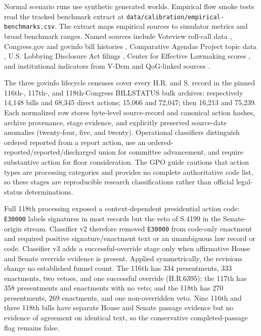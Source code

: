 \documentclass[manuscript]{acmart}
\begin{document}
Normal scenario runs use synthetic generated worlds. Empirical flow smoke tests read the tracked benchmark extract at \texttt{data/calibration/empirical-benchmarks.csv}. The extract maps empirical sources to simulator metrics and broad benchmark ranges. Named sources include Voteview roll-call data \citep{Voteview2021}, Congress.gov and govinfo bill histories \citep{CongressGovData,GovinfoBillStatus2020}, Comparative Agendas Project topic data \citep{ComparativeAgendasProject}, U.S. Lobbying Disclosure Act filings \citep{SenateLDA}, Center for Effective Lawmaking scores \citep{CenterEffectiveLawmaking,VoldenWiseman2014}, and institutional indicators from V-Dem and QoG-linked sources \citep{VDemDataset,QoGDataFinder2026}.

The three govinfo lifecycle censuses cover every H.R. and S. record in the pinned 116th-, 117th-, and 118th-Congress BILLSTATUS bulk archives: respectively 14,148 bills and 68,345 direct actions; 15,066 and 72,047; then 16,213 and 75,239. Each normalized row stores byte-level source-record and canonical action hashes, archive provenance, stage evidence, and explicitly preserved source-date anomalies (twenty-four, five, and twenty). Operational classifiers distinguish ordered reported from a report action, use an ordered-reported/reported/discharged union for committee advancement, and require substantive action for floor consideration. The GPO guide cautions that action types are processing categories and provides no complete authoritative code list, so these stages are reproducible research classifications rather than official legal-status determinations.

Full 118th processing exposed a context-dependent presidential action code: \texttt{E30000} labels signatures in most records but the veto of S.4199 in the Senate-origin stream. Classifier v2 therefore removed \texttt{E30000} from code-only enactment and required positive signature/enactment text or an unambiguous law record or code. Classifier v3 adds a successful-override stage only when affirmative House and Senate override evidence is present. Applied symmetrically, the revisions change no established funnel count. The 116th has 334 presentments, 333 enactments, two vetoes, and one successful override (H.R.6395); the 117th has 358 presentments and enactments with no veto; and the 118th has 270 presentments, 269 enactments, and one non-overridden veto. Nine 116th and three 118th bills have separate House and Senate passage evidence but no evidence of agreement on identical text, so the conservative completed-passage flag remains false.
\end{document}
